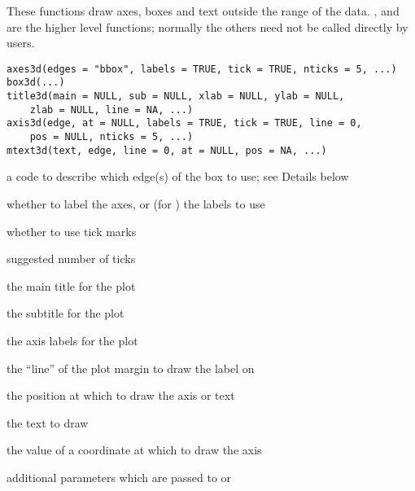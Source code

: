 \documentclass{article}
\begin{document}
\begin{Description}\relax
These functions draw axes, boxes and text outside the range of the data.
,  and  are the higher level functions; 
normally the others need not be called directly by users.
\end{Description}
\begin{Usage}
\begin{verbatim}
axes3d(edges = "bbox", labels = TRUE, tick = TRUE, nticks = 5, ...)
box3d(...) 
title3d(main = NULL, sub = NULL, xlab = NULL, ylab = NULL, 
    zlab = NULL, line = NA, ...) 
axis3d(edge, at = NULL, labels = TRUE, tick = TRUE, line = 0, 
    pos = NULL, nticks = 5, ...) 
mtext3d(text, edge, line = 0, at = NULL, pos = NA, ...) 
\end{verbatim}
\end{Usage}
\begin{Arguments}
\begin{ldescription}
\item[\code{edges}] a code to describe which edge(s) of the box to use; see Details below 
\item[\code{labels}] whether to label the axes, or (for ) the
labels to use
\item[\code{tick}] whether to use tick marks 
\item[\code{nticks}] suggested number of ticks 
\item[\code{main}] the main title for the plot 
\item[\code{sub}] the subtitle for the plot 
\item[\code{xlab, ylab, zlab}] the axis labels for the plot 
\item[\code{line}] the ``line'' of the plot margin to draw the label on 
\item[\code{edge, pos}] the position at which to draw the axis or text 
\item[\code{text}] the text to draw 
\item[\code{at}] the value of a coordinate at which to draw the axis 
\item[\code{...}] additional parameters which are passed to  or  
\end{ldescription}
\end{Arguments}
\end{document}
